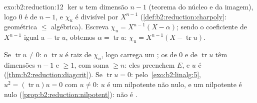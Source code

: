 \begin{solution}{exo:b2:reduction:12}
$\ker u$ tem dimensão $n - 1$ (teorema do núcleo e da imagem), logo $0$ é
 de  $n - 1$, e $\chi_u$ é
divisível por $X^{n-1}$
(\cref{def:b2:reduction:charpoly}: geométrica $\leq$ algébrica).
Escreva $\chi_u = X^{n-1}(X - \alpha)$; sendo o coeficiente de
$X^{n-1}$ igual a $-\operatorname{tr} u$, obtemos $\alpha =
\operatorname{tr} u$: $\chi_u = X^{n-1}(X - \operatorname{tr}
u)$.

Se $\operatorname{tr} u \neq 0$: o 
$\operatorname{tr} u$ é raiz de $\chi_u$, logo carrega um
; os  de $0$ e de $\operatorname{tr} u$
têm dimensões $n - 1$ e $\geq 1$, com soma $\geq n$: eles
preenchem $E$, e $u$ é 
(\cref{thm:b2:reduction:diagcrit}). Se $\operatorname{tr} u = 0$:
pelo~\cref{exo:b2:linalg:5}, $u^2 = (\operatorname{tr} u)u = 0$
com $u \neq 0$: $u$ é um nilpotente não nulo, e um nilpotente
 é nulo (\cref{prop:b2:reduction:nilpotent}): não é
.
\end{solution}

